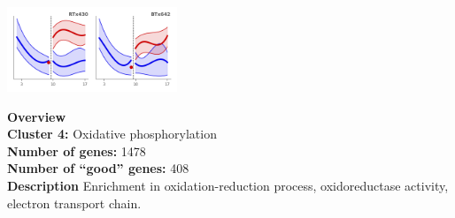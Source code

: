 \begin{multicols}{2}
\includegraphics[width=2in]{figures/clusters/leaf_Postflowering_3.png}
\columnbreak

\noindent \textbf{Overview}\\\textbf{Cluster 4:} Oxidative phosphorylation \\
\textbf{Number of genes:} 1478 \\
\textbf{Number of ``good'' genes:} 408 \\
\textbf{Description} Enrichment in oxidation-reduction process, oxidoreductase activity, electron transport chain. \\
\end{multicols}

